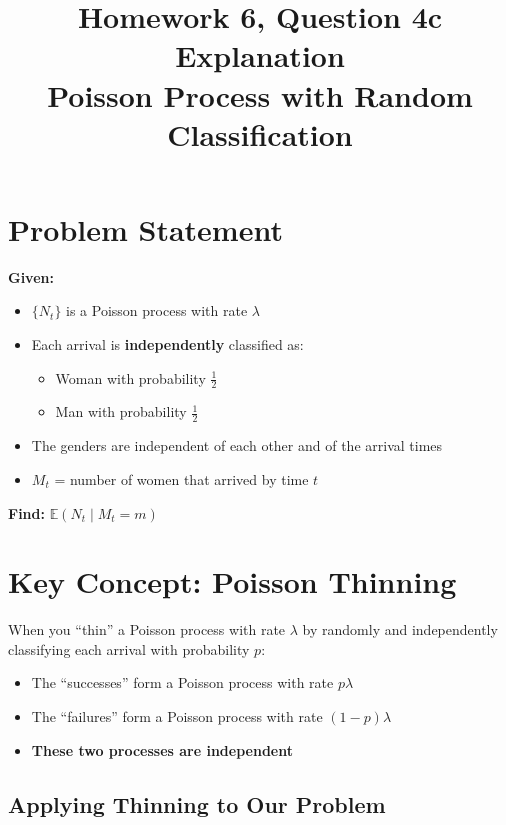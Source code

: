 \documentclass[11pt]{article}
\title{\textbf{Homework 6, Question 4c Explanation} \\ \large Poisson Process with Random Classification}
\author{}
\date{}
\begin{document}
\maketitle

\section{Problem Statement}

\textbf{Given:}
\begin{itemize}[noitemsep]
    \item $\{N_t\}$ is a Poisson process with rate $\lambda$
    \item Each arrival is \textbf{independently} classified as:
    \begin{itemize}
        \item Woman with probability $\frac{1}{2}$
        \item Man with probability $\frac{1}{2}$
    \end{itemize}
    \item The genders are independent of each other and of the arrival times
    \item $M_t$ = number of women that arrived by time $t$
\end{itemize}

\textbf{Find:} $\mathbb{E}(N_t \mid M_t = m)$

\section{Key Concept: Poisson Thinning}

\begin{tcolorbox}[colback=blue!5!white,colframe=blue!75!black,title=Poisson Thinning Theorem]
When you ``thin'' a Poisson process with rate $\lambda$ by randomly and independently classifying each arrival with probability $p$:
\begin{itemize}
    \item The ``successes'' form a Poisson process with rate $p\lambda$
    \item The ``failures'' form a Poisson process with rate $(1-p)\lambda$
    \item \textbf{These two processes are independent}
\end{itemize}
\end{tcolorbox}

\subsection{Applying Thinning to Our Problem}
\end{document}
